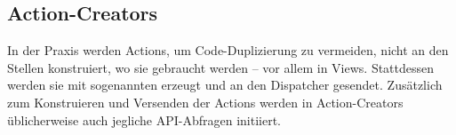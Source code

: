\subsection{Action-Creators}
\label{ssec:gf_action_creators}

In der Praxis werden Actions, um Code-Duplizierung zu vermeiden, nicht an den
Stellen konstruiert, wo sie gebraucht werden -- vor allem in Views.  Stattdessen
werden sie mit sogenannten  erzeugt und an den
Dispatcher gesendet.  Zusätzlich zum Konstruieren und Versenden der Actions
werden in Action-Creators üblicherweise auch jegliche API-Abfragen initiiert.
